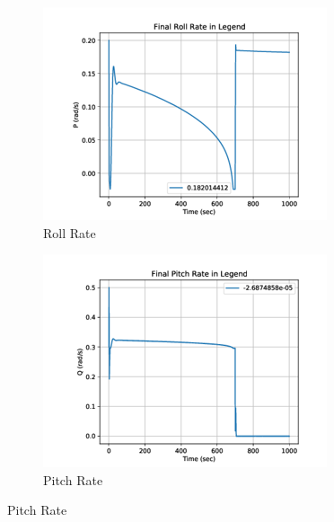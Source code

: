\documentclass[conf]{new-aiaa}
\begin{document}
\begin{figure}[H]
     \centering
     \begin{subfigure}[b]{0.3\textwidth}
         \centering
         \includegraphics[width=\textwidth]{Figures/2StageControl/Roll_Diaganol_Matrix.png}
         \caption{Roll Rate}
         \label{fig:Diagonal_Roll}
     \end{subfigure}
     \hfill
     \begin{subfigure}[b]{0.3\textwidth}
         \centering
         \includegraphics[width=\textwidth]{Figures/2StageControl/Pitch_Diaganol_Matrix.png}
         \caption{Pitch Rate}
         \label{fig:Diagonal_Pitch}
     \end{subfigure}
     \hfill

\end{figure}
\end{document}
